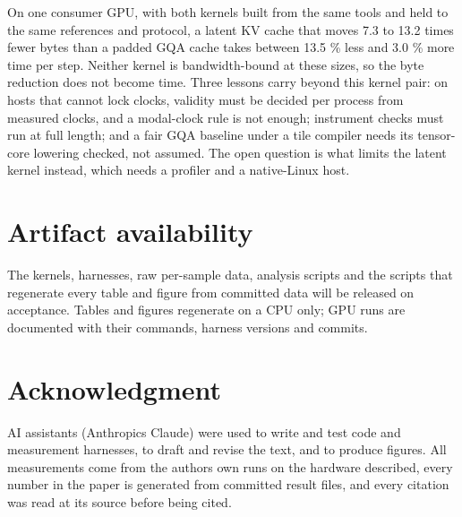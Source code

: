 \documentclass[conference]{IEEEtran}
\begin{document}
On one consumer GPU, with both kernels built from the same tools and held to the same references and protocol, a latent KV cache that moves 7.3 to 13.2 times fewer bytes than a padded GQA cache takes between 13.5 \% less and 3.0 \% more time per step. Neither kernel is bandwidth-bound at these sizes, so the byte reduction does not become time. Three lessons carry beyond this kernel pair: on hosts that cannot lock clocks, validity must be decided per process from measured clocks, and a modal-clock rule is not enough; instrument checks must run at full length; and a fair GQA baseline under a tile compiler needs its tensor-core lowering checked, not assumed. The open question is what limits the latent kernel instead, which needs a profiler and a native-Linux host.

\section{Artifact availability}\label{sec:10}

The kernels, harnesses, raw per-sample data, analysis scripts and the scripts that regenerate every table and figure from committed data will be released on acceptance. Tables and figures regenerate on a CPU only; GPU runs are documented with their commands, harness versions and commits.

\section*{Acknowledgment}

AI assistants (Anthropic\textquotesingle s Claude) were used to write and test code and measurement harnesses, to draft and revise the text, and to produce figures. All measurements come from the authors\textquotesingle{} own runs on the hardware described, every number in the paper is generated from committed result files, and every citation was read at its source before being cited.
\end{document}
